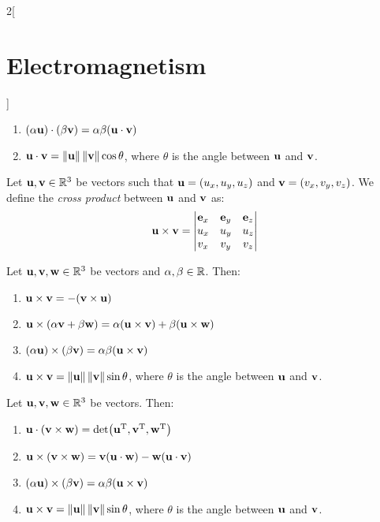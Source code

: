 \documentclass[../../../main_physics.tex]{subfiles}
\begin{document}
\begin{multicols}{2}[\section{Electromagnetism}]
\begin{proposition}
\begin{enumerate}
      \item $(\alpha\vf{u})\cdot(\beta\vf{v})=\alpha\beta(\vf{u}\cdot\vf{v})$
      \item $\vf{u}\cdot\vf{v}=\norm{\vf{u}}\norm{\vf{v}}\cos\theta$, where $\theta$ is the angle between $\vf{u}$ and $\vf{v}$.
    \end{enumerate}
  \end{proposition}
  \begin{definition}
    Let $\vf{u},\vf{v}\in\RR^3$ be vectors such that $\vf{u}=(u_x,u_y,u_z)$ and $\vf{v}=(v_x,v_y,v_z)$. We define the \emph{cross product} between $\vf{u}$ and $\vf{v}$ as: $$\vf{u}\times\vf{v}=
      \begin{vmatrix}
        \vf{e}_x & \vf{e}_y & \vf{e}_z \\
        u_x      & u_y      & u_z      \\
        v_x      & v_y      & v_z      \\
      \end{vmatrix}$$
  \end{definition}
  \begin{proposition}
    Let $\vf{u},\vf{v},\vf{w}\in\RR^3$ be vectors and $\alpha,\beta \in\RR$. Then:
    \begin{enumerate}
      \item $\vf{u}\times\vf{v}=-(\vf{v}\times\vf{u})$
      \item $\vf{u}\times(\alpha\vf{v}+\beta\vf{w})=\alpha(\vf{u}\times\vf{v})+\beta(\vf{u}\times\vf{w})$
      \item $(\alpha\vf{u})\times(\beta\vf{v})=\alpha\beta(\vf{u}\times\vf{v})$
      \item $\vf{u}\times\vf{v}=\norm{\vf{u}}\norm{\vf{v}}\sin\theta$, where $\theta$ is the angle between $\vf{u}$ and $\vf{v}$.
    \end{enumerate}
  \end{proposition}
  \begin{proposition}
    Let $\vf{u},\vf{v},\vf{w}\in\RR^3$ be vectors. Then:
    \begin{enumerate}
      \item $\vf{u}\cdot(\vf{v}\times\vf{w})=\det(\transpose{\vf{u}},\transpose{\vf{v}},\transpose{\vf{w}})$
      \item $\vf{u}\times(\vf{v}\times\vf{w})=\vf{v}(\vf{u}\cdot\vf{w})-\vf{w}(\vf{u}\cdot\vf{v})$
      \item $(\alpha\vf{u})\times(\beta\vf{v})=\alpha\beta(\vf{u}\times\vf{v})$
      \item $\vf{u}\times\vf{v}=\norm{\vf{u}}\norm{\vf{v}}\sin\theta$, where $\theta$ is the angle between $\vf{u}$ and $\vf{v}$.

\end{enumerate}
\end{proposition}
\end{multicols}
\end{document}
